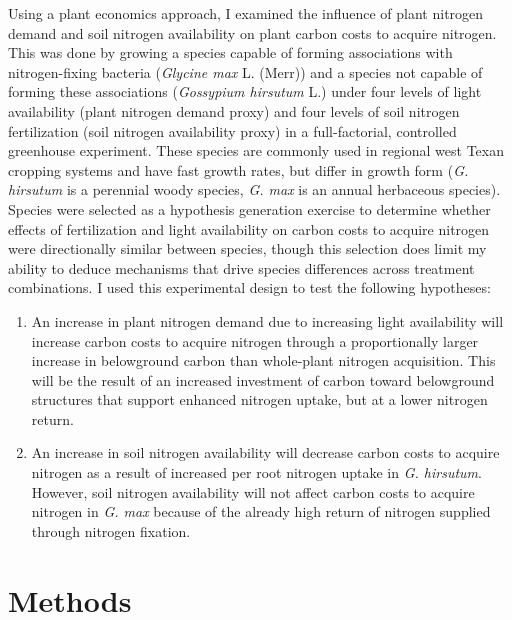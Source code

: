 Using a plant economics approach, I examined the influence of plant nitrogen demand and soil nitrogen availability on plant carbon costs to acquire nitrogen. This was done by growing a species capable of forming associations with nitrogen-fixing bacteria (\textit{Glycine max} L. (Merr)) and a species not capable of forming these associations (\textit{Gossypium hirsutum} L.) under four levels of light availability (plant nitrogen demand proxy) and four levels of soil nitrogen fertilization (soil nitrogen availability proxy) in a full-factorial, controlled greenhouse experiment. These species are commonly used in regional west Texan cropping systems and have fast growth rates, but differ in growth form (\textit{G. hirsutum} is a perennial woody species, \textit{G. max} is an annual herbaceous species). Species were selected as a hypothesis generation exercise to determine whether effects of fertilization and light availability on carbon costs to acquire nitrogen were directionally similar between species, though this selection does limit my ability to deduce mechanisms that drive species differences across treatment combinations. I used this experimental design to test the following hypotheses:
\begin{enumerate}
\item An increase in plant nitrogen demand due to increasing light availability will increase carbon costs to acquire nitrogen through a proportionally larger increase in belowground carbon than whole-plant nitrogen acquisition. This will be the result of an increased investment of carbon toward belowground structures that support enhanced nitrogen uptake, but at a lower nitrogen return. 

\item An increase in soil nitrogen availability will decrease carbon costs to acquire nitrogen as a result of increased per root nitrogen uptake in \textit{G. hirsutum}. However, soil nitrogen availability will not affect carbon costs to acquire nitrogen in \textit{G. max} because of the already high return of nitrogen supplied through nitrogen fixation.
\end{enumerate}

\section{Methods}
